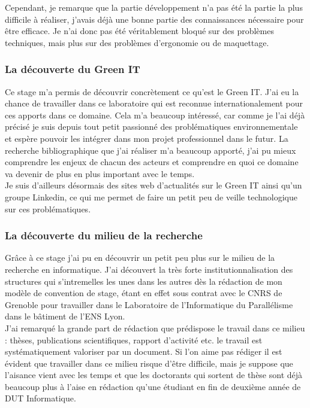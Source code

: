 Cependant, je remarque que la partie développement n'a pas été la partie la plus difficile à réaliser, j'avais déjà une bonne partie des connaissances nécessaire pour être efficace. Je n'ai donc pas été véritablement bloqué sur des problèmes techniques, mais plus sur des problèmes d'ergonomie ou de maquettage.

\subsubsection{La découverte du Green IT}
Ce stage m'a permis de découvrir concrètement ce qu'est le Green IT. J'ai eu la chance de travailler dans ce laboratoire qui est reconnue internationalement pour ces apports dans ce domaine. Cela m'a beaucoup intéressé, car comme je l'ai déjà précisé je suis depuis tout petit passionné des problématiques environnementale et espère pouvoir les intégrer dans mon projet professionnel dans le futur. La recherche bibliographique que j'ai réaliser m'a beaucoup apporté, j'ai pu mieux comprendre les enjeux de chacun des acteurs et comprendre en quoi ce domaine va devenir de plus en plus important avec le temps.\\

Je suis d'ailleurs désormais des sites web d'actualités sur le Green IT ainsi qu'un groupe Linkedin, ce qui me permet de faire un petit peu de veille technologique sur ces problématiques.

\subsubsection{La découverte du milieu de la recherche}
Grâce à ce stage j'ai pu en découvrir un petit peu plus sur le milieu de la recherche en informatique. J'ai découvert la très forte institutionnalisation des structures qui s'intremelles les unes dans les autres dès la rédaction de mon modèle de convention de stage, étant en effet sous contrat avec le CNRS de Grenoble pour travailler dans le Laboratoire de l'Informatique du Parallélisme dans le bâtiment de l'ENS Lyon.\\

J'ai remarqué la grande part de rédaction que prédispose le travail dans ce milieu : thèses, publications scientifiques, rapport d'activité etc. le travail est systématiquement valoriser par un document. Si l'on aime pas rédiger il est évident que travailler dans ce milieu risque d'être difficile, mais je suppose que l'aisance vient avec les temps et que les doctorants qui sortent de thèse sont déjà beaucoup plus à l'aise en rédaction qu'une étudiant en fin de deuxième année de DUT Informatique.\\

